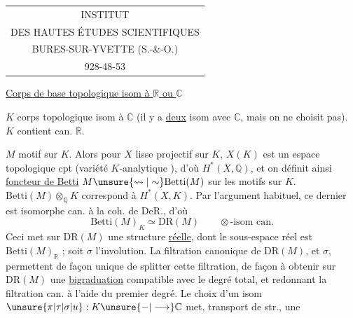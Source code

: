 \begin{tabular}{c}
INSTITUT\\
DES HAUTES ÉTUDES SCIENTIFIQUES\\
BURES-SUR-YVETTE (S.-\&-O.)\\
928-48-53
\end{tabular}

\uline{Corps de base topologique isom à $\mathbb R$ ou $\mathbb C$}

$K$ corps topologique isom à $\mathbb C$ (il y a  \uline{deux} isom avec $\mathbb C$, mais on ne choisit pas). $K$ contient can. $\mathbb R$.

$M$ motif sur $K$. Alors  pour  $X$ lisse projectif sur $K$, $X(K)$ est un espace topologique cpt (variété $K$-analytique ), d'où $H^{*}(X,\mathbb Q)$, et on définit ainsi \uline{foncteur de Betti} $M\unsure{\rightsquigarrow|\sim}\mathrm{Betti}(M)$ sur les motifs sur $K$. $\mathrm{Betti}(M)\otimes_{\mathbb Q}K$  correspond à $H^*(X,K)$. Par l'argument habituel, ce dernier est isomorphe can. à la coh. de DeR., d'où
\[
 \mathrm{Betti}(M)_K\simeq\mathrm{DR}(M)\qquad \otimes\text{-isom can.}
\]
Ceci met sur  $\mathrm{DR}(M)$ une structure \uline{réelle}, dont le sous-espace réel est $\mathrm{Betti}(M)_{\mathbb R}$ ; soit $\sigma$ l'involution. La filtration canonique de $\mathrm{DR}(M)$, et $\sigma$, permettent de façon unique de splitter cette filtration, de façon à obtenir sur $\mathrm{DR}(M)$ une \uline{bigraduation} compatible avec le degré total, et redonnant la filtration can. à l'aide du premier degré. Le choix d'un isom $\unsure{\pi|\tau|\sigma|u}:K\unsure{\mathord{-}|\longrightarrow}\mathbb C$ met,  transport de str., une

